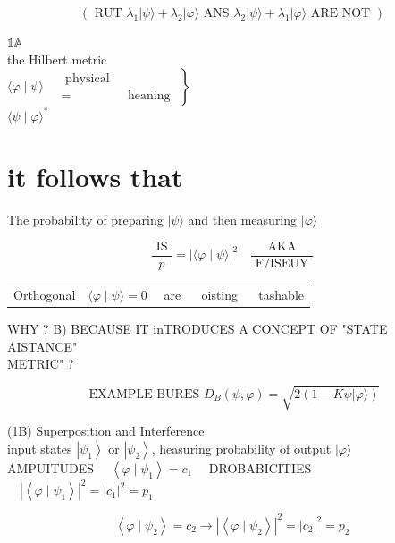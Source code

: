 \documentclass[10pt]{article}
\begin{document}
$$
\left(\text { RUT } \lambda_{1}|\psi\rangle+\lambda_{2}|\varphi\rangle \text { ANS } \lambda_{2}|\psi\rangle+\lambda_{1}|\varphi\rangle \text { ARE NOT }\right)
$$

$\mathbb{1 A}$\\
the Hilbert metric\\
$\left.\langle\varphi \mid \psi\rangle \quad \begin{array}{ll}\text { physical } & \\ = & \text { heaning }\end{array}\right\}$\\
$\langle\psi \mid \varphi\rangle^{*}$

\section*{it follows that}
The probability of preparing $|\psi\rangle$ and then measuring $|\varphi\rangle$

$$
\frac{\text { IS }}{p}=|\langle\varphi \mid \psi\rangle|^{2} \quad \frac{\text { AKA }}{\text { F/ISEUY }}
$$

\begin{center}
\begin{tabular}{ll}
Orthogonal & $\langle\varphi \mid \psi\rangle=0 \quad$ are $\quad$ oisting $\quad$ tashable \\
\end{tabular}
\end{center}

WHY ? B) BECAUSE IT inTRODUCES A CONCEPT OF "STATE AISTANCE"\\
METRIC" ?

$$
\text { EXAMPLE BURES } D_{B}(\psi, \varphi)=\sqrt{2(1-K \psi|\varphi\rangle)}
$$

(1B) Superposition and Interference\\
input states $\left|\psi_{1}\right\rangle$ or $\left|\psi_{2}\right\rangle$, heasuring probability of output $|\varphi\rangle$\\
AMPUITUDES $\quad\left\langle\varphi \mid \psi_{1}\right\rangle=c_{1} \quad$ DROBABICITIES $\quad\left|\left\langle\varphi \mid \psi_{1}\right\rangle\right|^{2}=\left|c_{1}\right|^{2}=p_{1}$

$$
\left\langle\varphi \mid \psi_{2}\right\rangle=c_{2} \longrightarrow\left|\left\langle\varphi \mid \psi_{2}\right\rangle\right|^{2}=\left|c_{2}\right|^{2}=p_{2}
$$
\end{document}
